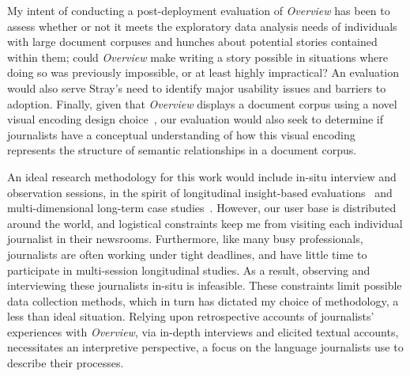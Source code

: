 My intent of conducting a post-deployment evaluation of {\it Overview} has been to assess whether or not it meets the exploratory data analysis needs of individuals with large document corpuses and hunches about potential stories contained within them; could {\it Overview} make writing a story possible in situations where doing so was previously impossible, or at least highly impractical? 
An evaluation would also serve Stray's need to identify major usability issues and barriers to adoption. 
Finally, given that {\it Overview} displays a document corpus using a novel visual encoding design choice~\cite{Ingram2012}, our evaluation would also seek to determine if journalists have a conceptual understanding of how this visual encoding represents the structure of semantic relationships in a document corpus.

An ideal research methodology for this work would include in-situ interview and observation sessions, in the spirit of longitudinal insight-based evaluations~\cite{Saraiya2006} and multi-dimensional long-term case studies~\cite{Shneiderman2006}.
However, our user base is distributed around the world, and logistical constraints keep me from visiting each individual journalist in their newsrooms.
Furthermore, like many busy professionals, journalists are often working under tight deadlines, and have little time to participate in multi-session longitudinal studies. 
As a result, observing and interviewing these journalists in-situ is infeasible. 
These constraints limit possible data collection methods, which in turn has dictated my choice of methodology, a less than ideal situation. 
Relying upon retrospective accounts of journalists' experiences with {\it Overview}, via in-depth interviews and elicited textual accounts, necessitates an interpretive perspective, a focus on the language journalists use to describe their processes. 

